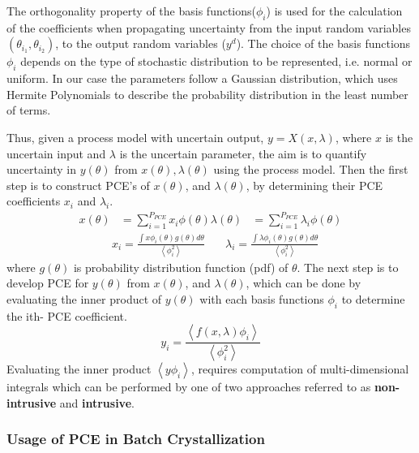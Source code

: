 \documentclass[3p,times,authoryear]{elsarticle}
\begin{document}
The orthogonality property of the basis functions($\phi_{i}$) is used for the calculation of the coefficients when propagating uncertainty from the input random variables$(\theta_{i_{1}}, \theta_{i_{2}})$, to the output random variables ($y^{d}$).
The choice of the basis functions $\phi_{i}$ depends on the type of stochastic distribution to be represented, i.e. normal or uniform. In our case the parameters follow a Gaussian distribution\cite{yenkie}, which uses Hermite Polynomials to describe the probability distribution in the least number of terms.\par
Thus, given a process model with uncertain output, $y = X(x,\lambda)$, where $x$ is the uncertain input and $\lambda$ is the uncertain parameter, the aim is to quantify uncertainty in $y(\theta)$ from $x(\theta), \lambda(\theta)$ using the process model. Then the first step is to construct PCE’s of $x(\theta)$, and $\lambda(\theta)$, by determining their PCE coefficients $x_{i}$ and $\lambda_{i}$.
\begin{align}
x(\theta) &= \sum_{i=1}^{P_{PCE}} x_{i}\phi(\theta)
\lambda(\theta) &= \sum_{i=1}^{P_{PCE}} \lambda_{i}\phi(\theta)
\end{align}
\begin{align}
&x_{i} = \frac{\int x\phi_{i}(\theta)g(\theta) d\theta}{\left\langle \phi^{2}_{i}\right\rangle } \quad
&\lambda_{i} = \frac{\int \lambda\phi_{i}(\theta)g(\theta) d\theta}{\left\langle \phi^{2}_{i}\right\rangle }
\end{align}
where $g(\theta)$ is probability distribution function (pdf) of $\theta$. 
The next step is to develop PCE for $y(\theta)$ from  $x(\theta)$, and $\lambda(\theta)$, which can be done by evaluating the
inner product of $y(\theta)$ with each basis functions $\phi_{i}$ to determine the ith- PCE coefficient.
\begin{equation}
y_{i} = \frac{\left\langle f(x,\lambda)\phi_{i} \right\rangle }{\left\langle \phi^{2}_{i} \right\rangle }
\end{equation}
Evaluating the inner product $\left\langle y\phi_{i} \right\rangle $, requires computation of multi-dimensional integrals which can be performed by one of two approaches referred to as \textbf{non-intrusive} and \textbf{intrusive}.

\subsubsection{Usage of PCE in Batch Crystallization}
\end{document}
